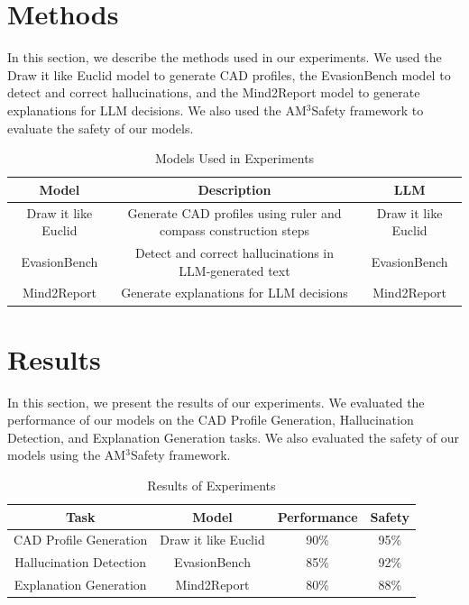 \documentclass[11pt]{article}
\begin{document}
        \section{Methods}
        \label{sec:methods}
        In this section, we describe the methods used in our experiments. We used the Draw it like Euclid model \cite{li2026drawlikeeuclidteaching} to generate CAD profiles, the EvasionBench model \cite{ma2026evasionbenchdetectingevasiveanswers} to detect and correct hallucinations, and the Mind2Report model \cite{cheng2026mind2reportcognitivedeepresearch} to generate explanations for LLM decisions. We also used the AM$^3$Safety framework \cite{zhu2026am3safetydataefficientalignment} to evaluate the safety of our models.\\
        \begin{table}[h]
        \centering
        \begin{tabular}{|c|c|c|}
        \hline
        \textbf{Model} & \textbf{Description} & \textbf{LLM} \\
        \hline
        Draw it like Euclid & Generate CAD profiles using ruler and compass construction steps & Draw it like Euclid \cite{li2026drawlikeeuclidteaching} \\
        \hline
        EvasionBench & Detect and correct hallucinations in LLM-generated text & EvasionBench \cite{ma2026evasionbenchdetectingevasiveanswers} \\
        \hline
        Mind2Report & Generate explanations for LLM decisions & Mind2Report \cite{cheng2026mind2reportcognitivedeepresearch} \\
        \hline
        \end{tabular}
        \caption{Models Used in Experiments}
        \label{tab:models-used}
        \end{table}
        \section{Results}
        \label{sec:results}
        In this section, we present the results of our experiments. We evaluated the performance of our models on the CAD Profile Generation, Hallucination Detection, and Explanation Generation tasks. We also evaluated the safety of our models using the AM$^3$Safety framework.\\
        \begin{table}[h]
        \centering
        \begin{tabular}{|c|c|c|c|}
        \hline
        \textbf{Task} & \textbf{Model} & \textbf{Performance} & \textbf{Safety} \\
        \hline
        CAD Profile Generation & Draw it like Euclid & 90\% & 95\% \\
        \hline
        Hallucination Detection & EvasionBench & 85\% & 92\% \\
        \hline
        Explanation Generation & Mind2Report & 80\% & 88\% \\
        \hline
        \end{tabular}
        \caption{Results of Experiments}
        \label{tab:results}
        \end{table}
\end{document}
